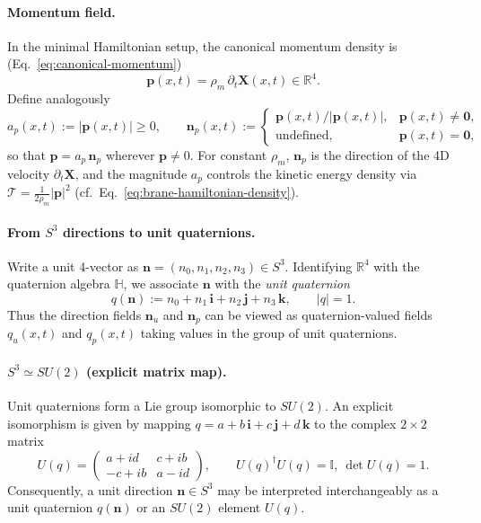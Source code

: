\paragraph{Momentum field.}
In the minimal Hamiltonian setup, the canonical momentum density is
(Eq.~\eqref{eq:canonical-momentum})
\[
\mathbf p(x,t)=\rho_m\,\partial_t \mathbf X(x,t)\in\mathbb R^4.
\]
Define analogously
\begin{equation}
  a_p(x,t) := |\mathbf p(x,t)| \ge 0,
  \qquad
  \mathbf n_p(x,t) :=
  \begin{cases}
    \mathbf p(x,t)/|\mathbf p(x,t)|, & \mathbf p(x,t)\neq \mathbf 0,\\
    \text{undefined}, & \mathbf p(x,t)=\mathbf 0,
  \end{cases}
  \label{eq:pi-amplitude-direction}
\end{equation}
so that $\mathbf p=a_p\,\mathbf n_p$ wherever $\mathbf p\neq 0$.
For constant $\rho_m$, $\mathbf n_p$ is the direction of the 4D velocity
$\partial_t\mathbf X$, and the magnitude $a_p$ controls the kinetic energy
density via $\mathcal T=\frac{1}{2\rho_m}|\mathbf p|^2$
(cf.\ Eq.~\eqref{eq:brane-hamiltonian-density}).

\paragraph{From $S^3$ directions to unit quaternions.}
Write a unit 4-vector as $\mathbf n=(n_0,n_1,n_2,n_3)\in S^3$.
Identifying $\mathbb R^4$ with the quaternion algebra $\mathbb H$,
we associate $\mathbf n$ with the \emph{unit quaternion}
\begin{equation}
  q(\mathbf n) := n_0 + n_1\,\mathbf i + n_2\,\mathbf j + n_3\,\mathbf k,
  \qquad |q|=1.
  \label{eq:unit-quaternion}
\end{equation}
Thus the direction fields $\mathbf n_u$ and $\mathbf n_p$ can be viewed as
quaternion-valued fields $q_u(x,t)$ and $q_p(x,t)$ taking values in the group
of unit quaternions.

\paragraph{$S^3\simeq SU(2)$ (explicit matrix map).}
Unit quaternions form a Lie group isomorphic to $SU(2)$.
An explicit isomorphism is given by mapping $q=a+b\,\mathbf i+c\,\mathbf j+d\,\mathbf k$
to the complex $2\times 2$ matrix
\begin{equation}
  U(q)=
  \begin{pmatrix}
    a+i d & c+i b\\
    -c+i b & a-i d
  \end{pmatrix},
  \qquad
  U(q)^\dagger U(q)=\mathbb I,\ \det U(q)=1.
  \label{eq:quaternion-to-su2}
\end{equation}
Consequently, a unit direction $\mathbf n\in S^3$ may be interpreted
interchangeably as a unit quaternion $q(\mathbf n)$ or an $SU(2)$ element $U(q)$.

